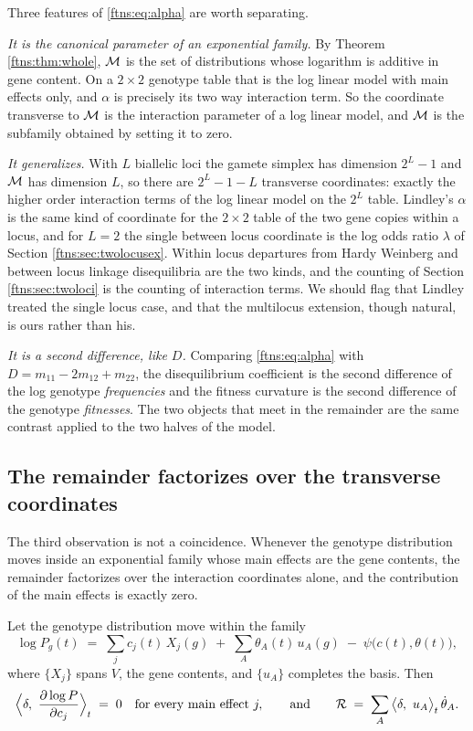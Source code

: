 Three features of \eqref{ftns:eq:alpha} are worth separating.

\emph{It is the canonical parameter of an exponential family.} By Theorem \ref{ftns:thm:whole}, $\mathcal{M}$ is
the set of distributions whose logarithm is additive in gene content. On a $2\times2$ genotype table
that is the log linear model with main effects only, and $\alpha$ is precisely its two way
interaction term. So the coordinate transverse to $\mathcal{M}$ is the interaction parameter of a log linear
model, and $\mathcal{M}$ is the subfamily obtained by setting it to zero.

\emph{It generalizes.} With $L$ biallelic loci the gamete simplex has dimension $2^L-1$ and $\mathcal{M}$
has dimension $L$, so there are $2^L-1-L$ transverse coordinates: exactly the higher order
interaction terms of the log linear model on the $2^L$ table. Lindley's $\alpha$ is the same kind of coordinate for the $2\times2$ table of the two gene copies within a locus, and for $L=2$ the single between locus coordinate is the log odds ratio $\lambda$ of Section \ref{ftns:sec:twolocusex}. Within locus departures from Hardy Weinberg and between locus linkage disequilibria are the
two kinds, and the counting of Section \ref{ftns:sec:twoloci} is the counting of interaction terms.
We should flag that Lindley treated the single locus case, and that the multilocus extension,
though natural, is ours rather than his.

\emph{It is a second difference, like $D$.} Comparing \eqref{ftns:eq:alpha} with
$D=m_{11}-2m_{12}+m_{22}$, the disequilibrium coefficient is the second difference of the
log genotype \emph{frequencies} and the fitness curvature is the second difference of the genotype
\emph{fitnesses}. The two objects that meet in the remainder are the same contrast applied to the
two halves of the model.

\subsection{The remainder factorizes over the transverse coordinates}

The third observation is not a coincidence. Whenever the genotype distribution moves inside an
exponential family whose main effects are the gene contents, the remainder factorizes over the
interaction coordinates alone, and the contribution of the main effects is exactly zero.

\begin{theorem}
\label{ftns:thm:expfam}
Let the genotype distribution move within the family
\[
\log P_g(t) \;=\; \sum_j c_j(t)\,X_j(g) \;+\; \sum_A \theta_A(t)\,u_A(g) \;-\; \psi\big(c(t),\theta(t)\big),
\]
where $\{X_j\}$ spans $V$, the gene contents, and $\{u_A\}$ completes the basis. Then
\begin{equation}
\Big\langle \delta,\ \frac{\partial \log P}{\partial c_j}\Big\rangle_t \;=\; 0
\quad\text{for every main effect } j,
\qquad\text{and}\qquad
\mathcal{R} \;=\; \sum_A \big\langle \delta,\ u_A\big\rangle_t\, \dot\theta_A .
\label{ftns:eq:expfam}
\end{equation}
\end{theorem}

